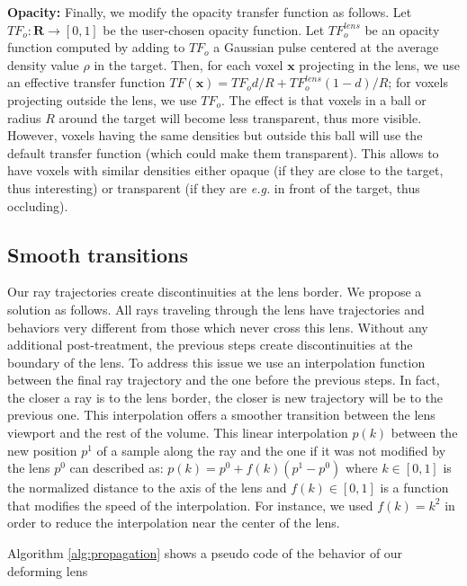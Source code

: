 \vspace{0.2cm}
\noindent\textbf{Opacity:} Finally, we modify the opacity transfer function as follows. Let $TF_{o} : \mathbf{R} \rightarrow [0,1]$ be the user-chosen opacity function. Let  $TF^{lens}_{o}$ be an opacity function computed by adding to $TF_{o}$ a Gaussian pulse centered at the average density value $\rho$ in the target. Then, for each voxel $\mathbf{x}$ projecting in the lens, we use an effective transfer function $TF(\mathbf{x}) = TF_{o} d/R + TF^{lens}_{o} (1-d)/R$; for voxels projecting outside the lens, we use $TF_{o}$. The effect is that voxels in a ball or radius $R$ around the target will become less transparent, thus more visible. However, voxels having the same densities but outside this ball will use the default transfer function (which could make them transparent). This allows to have voxels with similar densities either opaque (if they are close to the target, thus interesting) or transparent (if they are \emph{e.g.} in front of the target, thus occluding).


\subsection{Smooth transitions}
\label{continuity}
%
Our ray trajectories create discontinuities at the lens border. We propose a solution as follows. All rays traveling through the lens have trajectories and behaviors very different from those which never cross this lens. Without any additional post-treatment, the previous steps create discontinuities at the boundary of the lens. To address this issue we use an interpolation function between the final ray trajectory and the one before the previous steps. In fact, the closer a ray is to the lens border, the closer is new trajectory will be to the previous one. This interpolation offers a smoother transition between the lens viewport and the rest of the volume. This linear interpolation $p\left(k\right)$ between the new position $p^{1}$ of a sample along the ray and the one if it was not modified by the lens $p^{0}$ can described as: $p\left(k\right) = p^{0} + f\left(k\right)\left( p^{1} - p^{0} \right)$ where $k \in  \left[0,1\right]$  is the normalized distance to the axis of the lens and $ f\left(k\right)\in  \left[0,1\right]$ is a function that modifies the speed of the interpolation. For instance, we used $ f\left(k\right) = k^2$ in order to reduce the interpolation near the center of the lens.

Algorithm \ref{alg:propagation} shows a pseudo code of the behavior of our deforming lens


